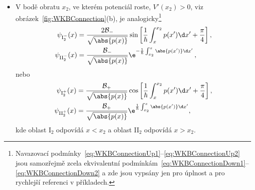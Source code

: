 \begin{itemize}
\item
    V bodě obratu $x_{2}$, ve kterém potenciál roste, $V'(x_{2})>0$, viz obrázek~\ref{fig:WKBConnection}(b), je analogicky\footnote{
        Navazovací podmínky~\eqref{eq:WKBConnectionUp1}--\eqref{eq:WKBConnectionUp2} jsou samozřejmě zcela ekvivalentní podmínkám~\eqref{eq:WKBConnectionDown1}--\eqref{eq:WKBConnectionDown2} a zde jsou vypsány jen pro úplnost a pro rychlejší referenci v příkladech.
    }
    \begin{subequations}
        \begin{align}
            \psi_{\mathrm{I}_{2}^{-}}(x)&=\frac{2\mathcal{B}_{-}}{\sqrt{\abs{p(x)}}}\sin\left[\frac{1}{\hbar}\int_{x}^{x_{2}}p(x')\d x'+\frac{\pi}{4}\right],\\
            \psi_{\mathrm{II}_{2}^{-}}(x)&=\frac{\mathcal{B}_{-}}{\sqrt{\abs{p(x)}}}\e^{-\frac{1}{\hbar}\int_{x_{2}}^{x}\abs{p(x')}\d x'}\,,
        \end{align}            
        \label{eq:WKBConnectionUp1}
    \end{subequations}
    nebo
    \begin{subequations}
        \begin{align}
            \psi_{\mathrm{I}_{2}^{+}}(x)&=\frac{\mathcal{B}_{+}}{\sqrt{\abs{p(x)}}}\cos\left[\frac{1}{\hbar}\int_{x}^{x_{2}}p(x')\d x'+\frac{\pi}{4}\right],\\
            \psi_{\mathrm{II}_{2}^{+}}(x)&=\frac{\mathcal{B}_{+}}{\sqrt{\abs{p(x)}}}\e^{\frac{1}{\hbar}\int_{x_{2}}^{x}\abs{p(x')}\d x'},
        \end{align}            
        \label{eq:WKBConnectionUp2}
    \end{subequations}
    kde oblast I$_{2}$ odpovídá $x<x_{2}$ a oblast II$_{2}$ odpovídá $x>x_{2}$.
\end{itemize}

